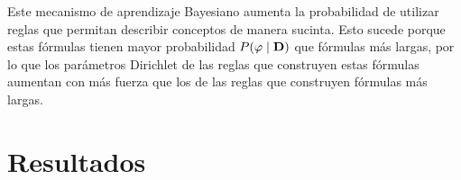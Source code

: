 Este mecanismo de aprendizaje Bayesiano aumenta la probabilidad de utilizar reglas que permitan describir conceptos de manera sucinta. Esto sucede porque estas fórmulas tienen mayor probabilidad $P(\varphi\mid \textbf{D})$ que fórmulas más largas, por lo que los parámetros Dirichlet de las reglas que construyen estas fórmulas aumentan con más fuerza que los de las reglas que construyen fórmulas más largas.   

\section{Resultados}

